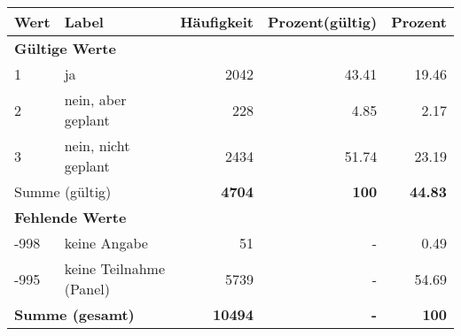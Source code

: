      \begin{longtable}{lXrrr}
     \toprule
     \textbf{Wert} & \textbf{Label} & \textbf{Häufigkeit} & \textbf{Prozent(gültig)} & \textbf{Prozent} \\
     \endhead
     \midrule
     \multicolumn{5}{l}{\textbf{Gültige Werte}}\\

     1 &
     \multicolumn{1}{X}{ ja   } &


       \num{2042} &
       \num[round-mode=places,round-precision=2]{43,41} &
         \num[round-mode=places,round-precision=2]{19,46} \\

     2 &
     \multicolumn{1}{X}{ nein, aber geplant   } &


       \num{228} &
       \num[round-mode=places,round-precision=2]{4,85} &
         \num[round-mode=places,round-precision=2]{2,17} \\

     3 &
     \multicolumn{1}{X}{ nein, nicht geplant   } &


       \num{2434} &
       \num[round-mode=places,round-precision=2]{51,74} &
         \num[round-mode=places,round-precision=2]{23,19} \\
     \midrule
     \multicolumn{2}{l}{Summe (gültig)} &
       \textbf{\num{4704}} &
     \textbf{100} &
       \textbf{\num[round-mode=places,round-precision=2]{44,83}} \\
     \multicolumn{5}{l}{\textbf{Fehlende Werte}}\\
       -998 &
       keine Angabe &
         \num{51} &
        - &
         \num[round-mode=places,round-precision=2]{0,49} \\
       -995 &
       keine Teilnahme (Panel) &
         \num{5739} &
        - &
         \num[round-mode=places,round-precision=2]{54,69} \\
     \midrule
     \multicolumn{2}{l}{\textbf{Summe (gesamt)}} &
          \textbf{\num{10494}} &
        \textbf{-} &
        \textbf{100} \\
     \bottomrule
     \end{longtable}
     
